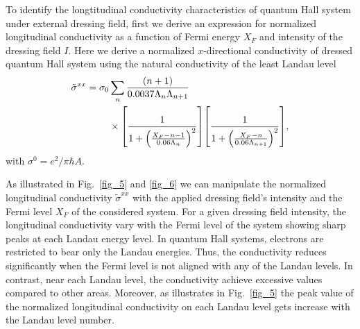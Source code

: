 
To identify the longtitudinal conductivity characteristics of quantum Hall system under external dressing field, first we derive an expression for normalized longitudinal conductivity as a function of Fermi energy $X_F$ and intensity of the dressing field $I$.
Here we derive a normalized $x$-directional conductivity of dressed quantum Hall system using the natural conductivity of the least Landau level
\begin{equation} \label{eq_35}
  \begin{aligned}
    \tilde{\sigma}^{xx} =
    \sigma_{0} &
    \sum_{n}
    \frac{\qty(n+1)}{0.0037\Lambda_n \Lambda_{n+1}} \\
    & \times
    \qty[
      \frac{1}
      {
        1 + \qty(\frac{X_F - n -1}{0.06\Lambda_n})^2
      }
    ]
    \qty[
      \frac{1}
      {
        1 + \qty(\frac{X_F - n}{0.06\Lambda_{n+1}})^2
      }
    ],
  \end{aligned}
\end{equation}
with $\sigma^0 = e^2/\pi \hbar A$.

As illustrated in Fig.~\ref{fig_5} and \ref{fig_6} we can manipulate the normalized longitudinal conductivity $\tilde{\sigma}^{xx}$ with the applied dressing field's intensity and the Fermi level $X_F$ of the considered system.
For a given dressing field intensity, the longitudinal conductivity vary with  the Fermi level of the system showing sharp peaks at each Landau energy level.
In quantum Hall systems, electrons are restricted to bear only the Landau energies. Thus, the conductivity reduces significantly when the Fermi level is not aligned with any of the Landau levels. In contrast, near each Landau level, the conductivity achieve excessive values compared to other areas. Moreover, as illustrates in Fig.~\ref{fig_5} the peak value of the normalized longitudinal conductivity on each Landau level gets increase with the Landau level number.

